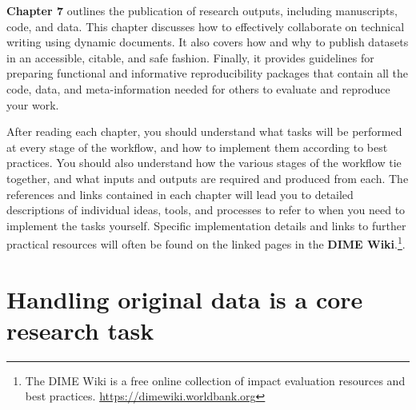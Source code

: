 \textbf{Chapter 7} outlines the publication of research outputs,
including manuscripts, code, and data.
This chapter discusses
how to effectively collaborate on technical writing
using dynamic documents.
It also covers how and why to publish datasets
in an accessible, citable, and safe fashion.
Finally, it provides guidelines for preparing
functional and informative reproducibility packages
that contain all the code, data, and meta-information needed
for others to evaluate and reproduce your work.

After reading each chapter, you should understand
what tasks will be performed at every stage of the workflow,
and how to implement them according to best practices.
You should also understand how the various stages of the workflow tie together,
and what inputs and outputs are required and produced from each.
The references and links contained in each chapter
will lead you to detailed descriptions of individual
ideas, tools, and processes to refer to when you need to implement the tasks yourself.
Specific implementation details and links to further practical resources
will often be found on the linked pages in the \textbf{DIME Wiki}.\footnote{
The DIME Wiki is a free online collection of impact evaluation resources and best practices. \url{https://dimewiki.worldbank.org}}.

\section{Handling original data is a core research task}

